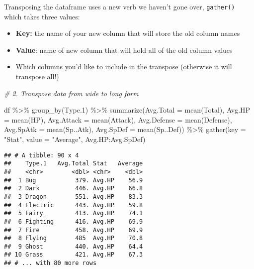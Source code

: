 \documentclass[
]{article}
\newenvironment{Shaded}{\begin{snugshade}}{\end{snugshade}}
\newcommand{\AttributeTok}[1]{\textcolor[rgb]{0.77,0.63,0.00}{#1}}
\newcommand{\CommentTok}[1]{\textcolor[rgb]{0.56,0.35,0.01}{\textit{#1}}}
\newcommand{\FloatTok}[1]{\textcolor[rgb]{0.00,0.00,0.81}{#1}}
\newcommand{\FunctionTok}[1]{\textcolor[rgb]{0.00,0.00,0.00}{#1}}
\newcommand{\NormalTok}[1]{#1}
\newcommand{\SpecialCharTok}[1]{\textcolor[rgb]{0.00,0.00,0.00}{#1}}
\newcommand{\StringTok}[1]{\textcolor[rgb]{0.31,0.60,0.02}{#1}}
\begin{document}
Transposing the dataframe uses a new verb we haven't gone over,
\texttt{gather()} which takes three values:

\begin{itemize}
\item
  \textbf{Key:} the name of your new column that will store the old
  column names
\item
  \textbf{Value}: name of new column that will hold all of the old
  column values
\item
  Which columns you'd like to include in the transpose (otherwise it
  will transpose all!)
\end{itemize}

\begin{Shaded}
\begin{Highlighting}[]
\CommentTok{\# 2. Transpose data from wide to long form}

\NormalTok{df }\SpecialCharTok{\%\textgreater{}\%} 
  \FunctionTok{group\_by}\NormalTok{(Type}\FloatTok{.1}\NormalTok{) }\SpecialCharTok{\%\textgreater{}\%}
  \FunctionTok{summarize}\NormalTok{(}\AttributeTok{Avg.Total =} \FunctionTok{mean}\NormalTok{(Total),}
            \AttributeTok{Avg.HP =} \FunctionTok{mean}\NormalTok{(HP),}
            \AttributeTok{Avg.Attack =} \FunctionTok{mean}\NormalTok{(Attack),}
            \AttributeTok{Avg.Defense =} \FunctionTok{mean}\NormalTok{(Defense),}
            \AttributeTok{Avg.SpAtk =} \FunctionTok{mean}\NormalTok{(Sp..Atk),}
            \AttributeTok{Avg.SpDef =} \FunctionTok{mean}\NormalTok{(Sp..Def)) }\SpecialCharTok{\%\textgreater{}\%}
  \FunctionTok{gather}\NormalTok{(}\AttributeTok{key =} \StringTok{"Stat"}\NormalTok{, }\AttributeTok{value =} \StringTok{"Average"}\NormalTok{, Avg.HP}\SpecialCharTok{:}\NormalTok{Avg.SpDef)}
\end{Highlighting}
\end{Shaded}

\begin{verbatim}
## # A tibble: 90 x 4
##    Type.1   Avg.Total Stat   Average
##    <chr>        <dbl> <chr>    <dbl>
##  1 Bug           379. Avg.HP    56.9
##  2 Dark          446. Avg.HP    66.8
##  3 Dragon        551. Avg.HP    83.3
##  4 Electric      443. Avg.HP    59.8
##  5 Fairy         413. Avg.HP    74.1
##  6 Fighting      416. Avg.HP    69.9
##  7 Fire          458. Avg.HP    69.9
##  8 Flying        485  Avg.HP    70.8
##  9 Ghost         440. Avg.HP    64.4
## 10 Grass         421. Avg.HP    67.3
## # ... with 80 more rows
\end{verbatim}
\end{document}
